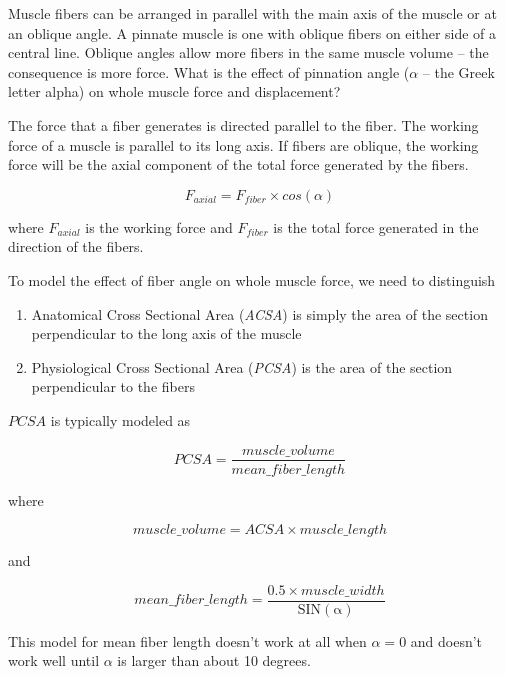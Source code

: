 \documentclass[]{book}
\begin{document}
Muscle fibers can be arranged in parallel with the main axis of the
muscle or at an oblique angle. A pinnate muscle is one with oblique
fibers on either side of a central line. Oblique angles allow more
fibers in the same muscle volume -- the consequence is more force. What
is the effect of pinnation angle (\(\alpha\) -- the Greek letter alpha)
on whole muscle force and displacement?

The force that a fiber generates is directed parallel to the fiber. The
working force of a muscle is parallel to its long axis. If fibers are
oblique, the working force will be the axial component of the total
force generated by the fibers.

\begin{equation}
F_{axial} = F_{fiber} \times cos(\alpha)
\end{equation}

where \(F_{axial}\) is the working force and \(F_{fiber}\) is the total
force generated in the direction of the fibers.

To model the effect of fiber angle on whole muscle force, we need to
distinguish

\begin{enumerate}
\def\labelenumi{\alph{enumi}.}
\item
  Anatomical Cross Sectional Area (\emph{ACSA}) is simply the area of
  the section perpendicular to the long axis of the muscle
\item
  Physiological Cross Sectional Area (\emph{PCSA}) is the area of the
  section perpendicular to the fibers
\end{enumerate}

\(PCSA\) is typically modeled as

\begin{equation}
PCSA = \frac{muscle\_volume}{mean\_fiber\_length}
\end{equation}

where

\begin{equation}
muscle\_volume = ACSA \times muscle\_length
\end{equation}

and

\begin{equation}
mean\_fiber\_length = \frac{0.5 \times muscle\_width}{\mathrm{SIN(\alpha)}}
\end{equation}

This model for mean fiber length doesn't work at all when \(\alpha=0\)
and doesn't work well until \(\alpha\) is larger than about 10 degrees.
\end{document}
